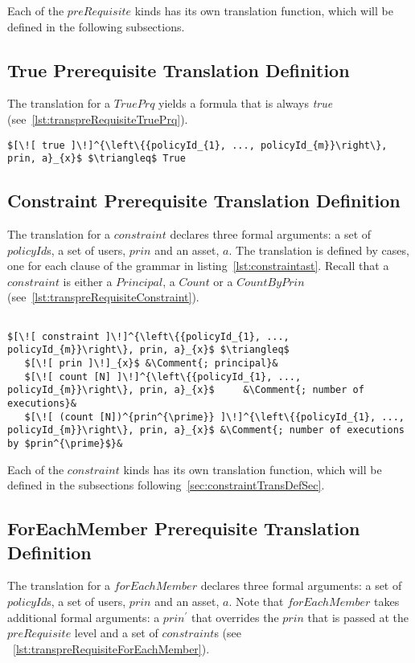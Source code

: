 Each of the $preRequisite$ kinds has its own translation function, which will be defined in the following subsections.

\subsection{True Prerequisite Translation Definition}
The translation for a $TruePrq$ yields a formula that is always \emph{true} (see~\ref{lst:transpreRequisiteTruePrq}).

\lstset{mathescape, language=AST}  
\begin{lstlisting}[frame=single, caption={Prerequisite Translation Definition {$\colon$} Always True Prerequisite},label={lst:transpreRequisiteTruePrq}]
	$[\![ true ]\!]^{\left\{{policyId_{1}, ..., policyId_{m}}\right\}, prin, a}_{x}$ $\triangleq$ True
\end{lstlisting}

\subsection{Constraint Prerequisite Translation Definition}
The translation for a $constraint$ declares three formal arguments: a set of $policyId$s, a set of users, $prin$ and an asset, $a$. The translation is defined by cases, one for each clause of the grammar in listing~\ref{lst:constraintast}. Recall that a $constraint$ is either a $Principal$, a $Count$ or a $CountByPrin$ (see~\ref{lst:transpreRequisiteConstraint}).


\lstset{mathescape, language=AST}  
\begin{lstlisting}[frame=single, caption={Prerequisite Translation Definition {$\colon$} Constraint},label={lst:transpreRequisiteConstraint}]

$[\![ constraint ]\!]^{\left\{{policyId_{1}, ..., policyId_{m}}\right\}, prin, a}_{x}$ $\triangleq$ 
   $[\![ prin ]\!]_{x}$ &\Comment{; principal}&
   $[\![ count [N] ]\!]^{\left\{{policyId_{1}, ..., policyId_{m}}\right\}, prin, a}_{x}$	 &\Comment{; number of executions}&
   $[\![ (count [N])^{prin^{\prime}} ]\!]^{\left\{{policyId_{1}, ..., policyId_{m}}\right\}, prin, a}_{x}$ &\Comment{; number of executions by $prin^{\prime}$}&
\end{lstlisting}

Each of the $constraint$ kinds has its own translation function, which will be defined in the subsections following~\ref{sec:constraintTransDefSec}.

\subsection{ForEachMember Prerequisite Translation Definition}
The translation for a $forEachMember$ declares three formal arguments: a set of $policyId$s, a set of users, $prin$ and an asset, $a$. Note that $forEachMember$ takes additional formal arguments: a $prin^{\prime}$ that overrides the $prin$ that is passed at the $preRequisite$ level and a set of $constraint$s (see ~\ref{lst:transpreRequisiteForEachMember}).


